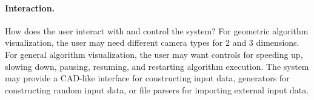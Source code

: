 
\paragraph{Interaction.} How does the user interact with and control the system?
For geometric algorithm visualization, the user may need different camera types
for 2 and 3 dimensions. For general algorithm visualization, the user may want
controls for speeding up, slowing down, pausing, resuming, and restarting
algorithm execution. The system may provide a CAD-like interface for
constructing input data, generators for constructing random input data, or file
parsers for importing external input data. 


